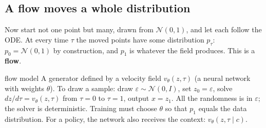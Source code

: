 \documentclass[11pt,a4paper]{article}
\newcommand{\N}{\mathcal{N}}
\begin{document}
\subsection{A flow moves a whole distribution}
Now start not one point but many, drawn from $\N(0,1)$, and let each follow the ODE. At every time $\tau$ the moved points have some distribution $p_\tau$: $p_0=\N(0,1)$ by construction, and $p_1$ is whatever the field produces. This is a \textbf{flow}.
\begin{newc}{flow model}
A generator defined by a velocity field $v_\theta(z,\tau)$ (a neural network with weights $\theta$). To draw a sample: draw $\varepsilon\sim\N(0,I)$, set $z_0=\varepsilon$, solve $dz/d\tau=v_\theta(z,\tau)$ from $\tau=0$ to $\tau=1$, output $x=z_1$. All the randomness is in $\varepsilon$; the solver is deterministic. Training must choose $\theta$ so that $p_1$ equals the data distribution. For a policy, the network also receives the context: $v_\theta(z,\tau\mid c)$.
\end{newc}
\end{document}
